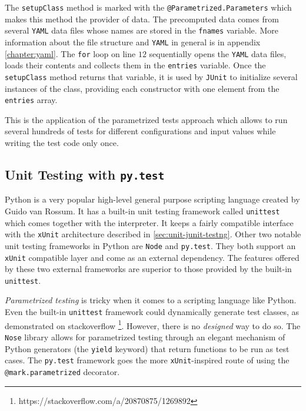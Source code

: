 The \texttt{setupClass} method is marked with the \texttt{@Parametrized.Parameters} which makes this method the provider of data. The precomputed data comes from several \texttt{YAML} data files whose names are stored in the \texttt{fnames} variable. More information about the file structure and \texttt{YAML} in general is in appendix \ref{chapter:yaml}. The \texttt{for} loop on line \(12\) sequentially opens the \texttt{YAML} data files, loads their contents and collects them in the \texttt{entries} variable. Once the \texttt{setupClass} method returns that variable, it is used by \texttt{JUnit} to initialize several instances of the class, providing each constructor with one element from the \texttt{entries} array.

This is the application of the parametrized tests approach which allows to run several hundreds of tests for different configurations and input values while writing the test code only once.

\subsection{Unit Testing with \texttt{py.test}}
\label{sec:unit-pytest}

Python is a very popular high-level general purpose scripting language created by Guido van Rossum. It has a built-in unit testing framework called \texttt{unittest} which comes together with the interpreter. It keeps a fairly compatible interface with the \texttt{xUnit} architecture described in \ref{sec:unit-junit-testng}. Other two notable unit testing frameworks in Python are \texttt{Node} and \texttt{py.test}. They both support an \texttt{xUnit} compatible layer and come as an external dependency. The features offered by these two external frameworks are superior to those provided by the built-in \texttt{unittest}.

\emph{Parametrized testing} is tricky when it comes to a scripting language like Python. Even the built-in \texttt{unittest} framework could dynamically generate test classes, as demonstrated on stackoverflow \footnote{https://stackoverflow.com/a/20870875/1269892}. However, there is no \emph{designed} way to do so. The \texttt{Nose} library allows for parametrized testing through an elegant mechanism of Python generators (the \texttt{yield} keyword) that return functions to be run as test cases. The \texttt{py.test} framework goes the more \texttt{xUnit}-inspired route of using the \texttt{@mark.parametrized} decorator.

